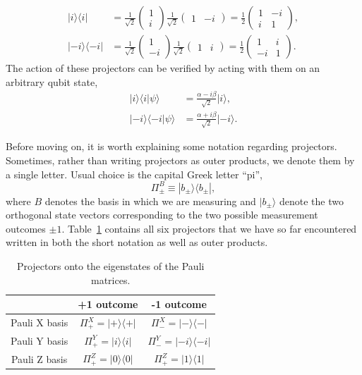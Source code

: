 \begin{align}
    |i\rangle\langle i| & = \frac{1}{\sqrt{2}} \begin{pmatrix} 1 \\ i \end{pmatrix} \frac{1}{\sqrt{2}} \begin{pmatrix} 1 & -i \end{pmatrix} = \frac{1}{2} \begin{pmatrix} 1 & -i \\ i & 1 \end{pmatrix}, \\
    |-i\rangle\langle-i| & = \frac{1}{\sqrt{2}} \begin{pmatrix} 1 \\ -i \end{pmatrix} \frac{1}{\sqrt{2}} \begin{pmatrix} 1 & i \end{pmatrix} = \frac{1}{2} \begin{pmatrix} 1 & i \\ -i & 1 \end{pmatrix}.
\end{align}
The action of these projectors can be verified by acting with them on an arbitrary qubit state,
\begin{align}
    |i\rangle\langle i|\psi\rangle & = \frac{\alpha-i\beta}{\sqrt{2}} |i\rangle, \\
    |-i\rangle\langle-i|\psi\rangle & = \frac{\alpha+i\beta}{\sqrt{2}} |-i\rangle.
\end{align}

Before moving on, it is worth explaining some notation regarding projectors.
Sometimes, rather than writing projectors as outer products, we denote them by a single letter.
Usual choice is the capital Greek letter ``pi'',
\begin{equation}
    \Pi_{\pm}^B \equiv |b_{\pm}\rangle\langle b_{\pm}|,
\end{equation}
where $B$ denotes the basis in which we are measuring and $|b_{\pm}\rangle$ denote the two orthogonal state vectors corresponding to the two possible measurement outcomes $\pm1$.
Table~\ref{tab:3-2_projectors} contains all six projectors that we have so far encountered written in both the short notation as well as outer products.
\begin{table}[h]
    \centering
    \begin{tabular}{c|c|c}
         & +1 outcome & -1 outcome \\
         \hline
        Pauli X basis & $\Pi^X_+ = |+\rangle\langle+|$ & $\Pi^X_- = |-\rangle\langle-|$ \\
        Pauli Y basis & $\Pi^Y_+ = |i\rangle\langle i|$ & $\Pi^Y_- = |-i\rangle\langle -i|$ \\
        Pauli Z basis & $\Pi^Z_+ = |0\rangle\langle 0|$ & $\Pi^Z_+ = |1\rangle\langle 1|$ \\
    \end{tabular}
    \caption{Projectors onto the eigenstates of the Pauli matrices.}
    \label{tab:3-2_projectors}
\end{table}


